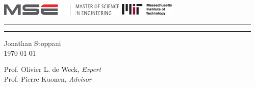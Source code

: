 \begin{titlepage}
\AddToShipoutPicture*{\BackgroundPic}
\thispagestyle{empty}

\vspace*{1mm}
\includegraphics[height=6mm]{images/logo_mse}
\hfill
\includegraphics[height=6mm]{images/logo-mit}
\vspace{5mm}

\newsavebox{\maintitle}
\savebox{\maintitle}{\Huge\justifying\doctitle\par}

\newlength{\titlew}
\settowidth{\titlew}{\usebox{\maintitle}}


\hrule
\vspace{0.2mm}
{\Huge\justifying\doctitle\linebreak\par}
\vspace{-5.5mm}
\hrule
\hspace{0.6mm}\begin{minipage}[t]{0.993\textwidth}
\end{minipage}
\vspace{5mm}
\vfill

Jonathan Stoppani\\[1.5mm]
\today

\vfill

Prof. Olivier L. de Weck, \emph{Expert}\\[2mm]
Prof. Pierre Kuonen, \emph{Advisor}\\[2mm]

\vspace{115mm}
\end{titlepage}
